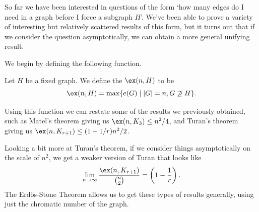 \documentclass[a4paper]{scrartcl}
\begin{document}
So far we have been interested in questions of the form `how many edges do I need in a graph before I force a subgraph $H$'. 
We've been able to prove a variety of interesting but relatively scattered results of this form, but it turns out that if we consider the question asymptotically, we can obtain a more general unifying result.


We begin by defining the following function.

\begin{definition}
	Let $H$ be a fixed graph. We define the  $\ex(n, H)$ to be
	$$\ex(n, H) = \max\{e(G) \mid |G| = n, G \not\supseteq H\}.$$
\end{definition}

Using this function we can restate some of the results we previously obtained, such as Matel's theorem giving us $\ex(n, K_3) \leq n^2/4$, and Turan's theorem giving us $\ex(n, K_{r + 1}) \leq (1 - 1/r)n^2/2$. 

Looking a bit more at Turan's theorem, if we consider things asymptotically on the scale of $n^2$, we get a weaker version of Turan that looks like
$$
\lim_{n \to \infty} \frac{\ex(n, K_{r + 1})}{\binom{n}{2}} = \left(1 - \frac 1r\right).
$$
The Erdős-Stone Theorem allows us to get these types of results generally, using just the chromatic number of the graph.
\end{document}
